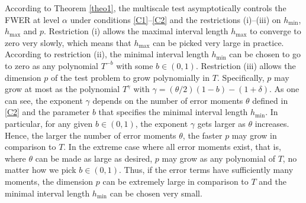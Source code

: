 \documentclass[a4paper,12pt]{article}
\numberwithin{equation}{section}
\begin{document}
\noindent According to Theorem \ref{theo1}, the multiscale test asymptotically controls the FWER at level $\alpha$ under conditions \ref{C1}--\ref{C2} and the restrictions (i)--(iii) on $h_{\min}$, $h_{\max}$ and $p$. %
Restriction (i) allows the maximal interval length $h_{\max}$ to converge to zero very slowly, which means that $h_{\max}$ can be picked very large in practice. According to restriction (ii), the minimal interval length $h_{\min}$ can be chosen to go to zero as any polynomial $T^{-b}$ with some $b \in (0,1)$. Restriction (iii) allows the dimension $p$ of the test problem to grow polynomially in $T$. Specifically, $p$ may grow at most as the polynomial $T^{\gamma}$ with $\gamma = (\theta/2)(1-b)-(1+\delta)$. As one can see, the exponent $\gamma$ depends on the number of error moments $\theta$ defined in \ref{C2} and the parameter $b$ that specifies the minimal interval length $h_{\min}$. In particular, for any given $b \in (0,1)$, the exponent $\gamma$ gets larger as $\theta$ increases. Hence, the larger the number of error moments $\theta$, the faster $p$ may grow in comparison to $T$. In the extreme case where all error moments exist, that is, where $\theta$ can be made as large as desired, $p$ may grow as any polynomial of $T$, no matter how we pick $b \in (0,1)$. Thus, if the error terms have sufficiently many moments, the dimension $p$ can be extremely large in comparison to $T$ and the minimal interval length $h_{\min}$ can be chosen very small. 
\end{document}

